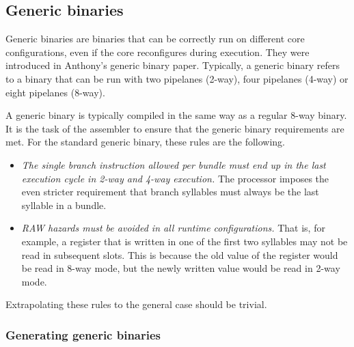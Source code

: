 
\subsection{Generic binaries}
\label{sec:core-ug-isa-gen-bin}


Generic binaries are binaries that can be correctly run on different core 
configurations, even if the core reconfigures during execution. They were 
introduced in Anthony's generic binary paper.  Typically, a generic binary refers to a binary that can 
be run with two pipelanes (2-way), four pipelanes (4-way) or eight pipelanes 
(8-way).

A generic binary is typically compiled in the same way as a regular 8-way
binary. It is the task of the assembler to ensure that the generic binary
requirements are met. For the standard generic binary, these rules are the
following.

\begin{itemize}

\item \emph{The single branch instruction allowed per bundle must end up in the 
last execution cycle in 2-way and 4-way execution.} The \rvex{} processor
imposes the even stricter requirement that branch syllables must always be the
last syllable in a bundle.

\item \emph{RAW hazards must be avoided in all runtime configurations.} That is,
for example, a register that is written in one of the first two syllables may
not be read in subsequent slots. This is because the old value of the register
would be read in 8-way mode, but the newly written value would be read in 2-way
mode.

\end{itemize}

\noindent Extrapolating these rules to the general case should be trivial.

\subsubsection{Generating generic binaries}
\label{sec:core-ug-isa-gen-gen}

